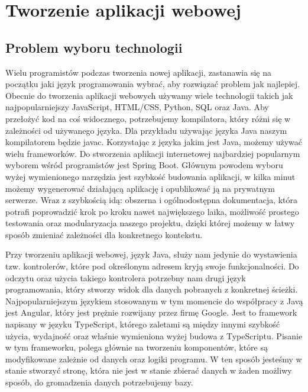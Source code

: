 \chapter{Tworzenie aplikacji webowej}

\section{Problem wyboru technologii}
	Wielu programistów podczas tworzenia nowej aplikacji, zastanawia się na początku jaki język programowania wybrać, aby rozwiązać problem jak najlepiej. Obecnie do tworzenia aplikacji webowych używamy wiele technologii takich jak najpopularniejszy JavaScript, HTML/CSS, Python, SQL oraz Java. Aby przełożyć kod na coś widocznego, potrzebujemy kompilatora, który różni się w zależności od używanego języka. Dla przykładu używając języka Java naszym kompilatorem będzie javac. Korzystając z języka jakim jest Java, możemy używać wielu frameworków. Do stworzenia aplikacji internetowej najbardziej popularnym wyborem wśród programistów jest Spring Boot. Głównym powodem wyboru wyżej wymienionego narzędzia jest szybkość budowania aplikacji, w kilka minut możemy wygenerować działającą aplikację i opublikować ją na prywatnym serwerze. Wraz z szybkością idą: obszerna i ogólnodostępna dokumentacja, która potrafi poprowadzić krok po kroku nawet największego laika, możliwość prostego testowania oraz modularyzacja naszego projektu, dzięki której możemy w łatwy sposób zmieniać zależności dla konkretnego kontekstu.
	
Przy tworzeniu aplikacji webowej, język Java, służy nam jedynie do wystawienia tzw. kontrolerów, które pod określonym adresem kryją swoje funkcjonalności. Do odczytu oraz użycia takiego kontrolera potrzebny nam drugi język programowania, który stworzy widok dla danych pobranych z konkretnej ścieżki. Najpopularniejszym językiem stosowanym w tym momencie do współpracy z Javą jest Angular, który jest prężnie rozwijany przez firmę Google. Jest to framework napisany w języku TypeScript, którego zaletami są między innymi szybkość użycia, wydajność oraz właśnie wymieniona wyżej budowa z TypeScriptu. Pisanie w tym frameworku, polega głównie na tworzeniu komponentów, które są modyfikowane zależnie od danych oraz logiki programu. W ten sposób jesteśmy w stanie stworzyć stronę, która nie jest w stanie zbierać danych w żaden możliwy sposób, do gromadzenia danych potrzebujemy bazy.


